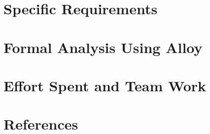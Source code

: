 \clearpage
\section{Specific Requirements}
\label{sect:requirements}


\clearpage
\section{Formal Analysis Using Alloy}
\label{sect:alloy}


\clearpage
\section{Effort Spent and Team Work}
\label{sect:effort&team}


\clearpage
\section{References}
\label{sect:references}




